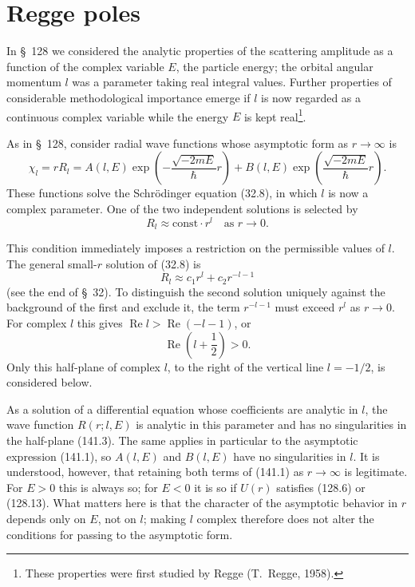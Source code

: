 \section{Regge poles}

In \S~128 we considered the analytic properties of the scattering amplitude
as a function of the complex variable $E$, the particle energy; the orbital
angular momentum $l$ was a parameter taking real integral values. Further
properties of considerable methodological importance emerge if $l$ is now
regarded as a continuous complex variable while the energy $E$ is kept
real\footnote{These properties were first studied by Regge (T.~Regge, 1958).}.

As in \S~128, consider radial wave functions whose asymptotic form as
$r\to\infty$ is
\begin{equation}
 \chi_l=rR_l=A(l,E)\exp\left(-\frac{\sqrt{-2mE}}{\hbar}r\right)
 +B(l,E)\exp\left(\frac{\sqrt{-2mE}}{\hbar}r\right).
 \tag{141.1}
\end{equation}
These functions solve the Schrödinger equation (32.8), in which $l$ is now a
complex parameter. One of the two independent solutions is selected by
\begin{equation}
 R_l\approx\mathrm{const}\cdot r^l\quad\text{as }r\to0.
 \tag{141.2}
\end{equation}

This condition immediately imposes a restriction on the permissible values
of $l$. The general small-$r$ solution of (32.8) is
\[
 R_l\approx c_1r^l+c_2r^{-l-1}
\]
(see the end of \S~32). To distinguish the second solution uniquely against
the background of the first and exclude it, the term $r^{-l-1}$ must exceed
$r^l$ as $r\to0$. For complex $l$ this gives
$\operatorname{Re}l>\operatorname{Re}(-l-1)$, or
\begin{equation}
 \operatorname{Re}\left(l+\frac12\right)>0.
 \tag{141.3}
\end{equation}
Only this half-plane of complex $l$, to the right of the vertical line
$l=-1/2$, is considered below.

As a solution of a differential equation whose coefficients are analytic in
$l$, the wave function $R(r;l,E)$ is analytic in this parameter and has no
singularities in the half-plane (141.3). The same applies in particular to
the asymptotic expression (141.1), so $A(l,E)$ and $B(l,E)$ have no
singularities in $l$. It is understood, however, that retaining both terms of
(141.1) as $r\to\infty$ is legitimate. For $E>0$ this is always so; for
$E<0$ it is so if $U(r)$ satisfies (128.6) or (128.13). What matters here is
that the character of the asymptotic behavior in $r$ depends only on $E$, not
on $l$; making $l$ complex therefore does not alter the conditions for
passing to the asymptotic form.

